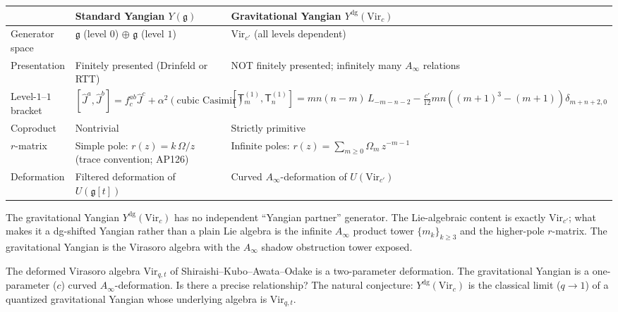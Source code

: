 \documentclass[11pt]{article}
\newcommand{\fg}{\mathfrak{g}}
\begin{document}
\begin{center}
\renewcommand{\arraystretch}{1.4}
\small
\begin{tabular}{@{}p{3.2cm}p{5.4cm}p{5.4cm}@{}}
\toprule
& \textbf{Standard Yangian $Y(\fg)$}
& \textbf{Gravitational Yangian $Y^{\mathrm{dg}}(\mathrm{Vir}_c)$}
\\
\midrule
Generator space
& $\fg$ (level $0$) $\oplus$ $\fg$ (level $1$)
& $\mathrm{Vir}_{c'}$ (all levels dependent)
\\
Presentation
& Finitely presented (Drinfeld or RTT)
& NOT finitely presented; infinitely many $A_\infty$ relations
\\
Level-$1$--$1$ bracket
& $[\hat{J}^a, \hat{J}^b] = f^{ab}_c\hat{J}^c
  + \alpha^2(\text{cubic Casimir})$
& $[\mathsf{T}_m^{(1)}, \mathsf{T}_n^{(1)}]
  = mn(n{-}m)\,L_{-m-n-2}
  - \frac{c'}{12}mn((m{+}1)^3{-}(m{+}1))\delta_{m+n+2,0}$
\\
Coproduct
& Nontrivial
& Strictly primitive
\\
$r$-matrix
& Simple pole: $r(z) = k\,\Omega/z$ \textup{(trace convention; AP126)}
& Infinite poles: $r(z) = \sum_{m \ge 0}\Omega_m\,z^{-m-1}$
\\
Deformation
& Filtered deformation of $U(\fg[t])$
& Curved $A_\infty$-deformation of $U(\mathrm{Vir}_{c'})$
\\
\bottomrule
\end{tabular}
\end{center}

\begin{observation}
The gravitational Yangian $Y^{\mathrm{dg}}(\mathrm{Vir}_c)$ has no
independent ``Yangian partner'' generator.  The Lie-algebraic content
is exactly $\mathrm{Vir}_{c'}$; what makes it a dg-shifted Yangian
rather than a plain Lie algebra is the infinite $A_\infty$ product
tower $\{m_k\}_{k \ge 3}$ and the higher-pole $r$-matrix.  The
gravitational Yangian is the Virasoro algebra with the $A_\infty$
shadow obstruction tower exposed.
\end{observation}

\begin{question}
The deformed Virasoro algebra $\mathrm{Vir}_{q,t}$ of
Shiraishi--Kubo--Awata--Odake is a two-parameter deformation.
The gravitational Yangian is a one-parameter ($c$) curved
$A_\infty$-deformation.  Is there a precise relationship?  The
natural conjecture: $Y^{\mathrm{dg}}(\mathrm{Vir}_c)$ is the
classical limit ($q \to 1$) of a quantized gravitational Yangian
whose underlying algebra is $\mathrm{Vir}_{q,t}$.
\end{question}
\end{document}
